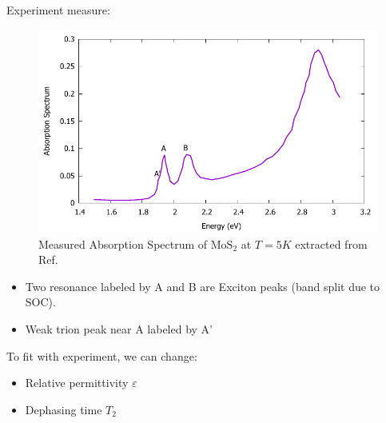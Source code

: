 \documentclass{beamer}
\begin{document}
	\begin{frame}
		Experiment measure:
		\begin{multicols}{2}
		\begin{figure}
	\includegraphics[width = 1\linewidth]{images/Experiment.pdf}
	\caption{Measured Absorption Spectrum of $\mathrm{MoS}_2$ at $T=5K$  extracted from Ref.  \autocite{zhang_absorption_2014}}
	\end{figure}
	\columnbreak
	\begin{itemize}
		\item Two resonance labeled by A and B are Exciton peaks (band split due to SOC).
		\item Weak trion peak near A labeled by A'
	\end{itemize}
To fit with experiment, we can change:
\begin{itemize}
\item Relative permittivity $\varepsilon$
\item Dephasing time $T_2$
\end{itemize}
	\end{multicols}
	\end{frame}
\end{document}
